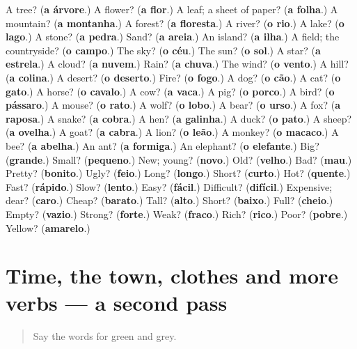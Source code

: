 \begin{tcolorbox}[breakable,colback=teal!4,colframe=teal!35!black,title={Before you move on}]
A tree? (\textbf{a árvore}.) A flower? (\textbf{a flor}.) A leaf; a sheet of paper? (\textbf{a folha}.) A mountain? (\textbf{a montanha}.) A forest? (\textbf{a floresta}.) A river? (\textbf{o rio}.) A lake? (\textbf{o lago}.) A stone? (\textbf{a pedra}.) Sand? (\textbf{a areia}.) An island? (\textbf{a ilha}.) A field; the countryside? (\textbf{o campo}.) The sky? (\textbf{o céu}.) The sun? (\textbf{o sol}.) A star? (\textbf{a estrela}.) A cloud? (\textbf{a nuvem}.) Rain? (\textbf{a chuva}.) The wind? (\textbf{o vento}.) A hill? (\textbf{a colina}.) A desert? (\textbf{o deserto}.) Fire? (\textbf{o fogo}.) A dog? (\textbf{o cão}.) A cat? (\textbf{o gato}.) A horse? (\textbf{o cavalo}.) A cow? (\textbf{a vaca}.) A pig? (\textbf{o porco}.) A bird? (\textbf{o pássaro}.) A mouse? (\textbf{o rato}.) A wolf? (\textbf{o lobo}.) A bear? (\textbf{o urso}.) A fox? (\textbf{a raposa}.) A snake? (\textbf{a cobra}.) A hen? (\textbf{a galinha}.) A duck? (\textbf{o pato}.) A sheep? (\textbf{a ovelha}.) A goat? (\textbf{a cabra}.) A lion? (\textbf{o leão}.) A monkey? (\textbf{o macaco}.) A bee? (\textbf{a abelha}.) An ant? (\textbf{a formiga}.) An elephant? (\textbf{o elefante}.) Big? (\textbf{grande}.) Small? (\textbf{pequeno}.) New; young? (\textbf{novo}.) Old? (\textbf{velho}.) Bad? (\textbf{mau}.) Pretty? (\textbf{bonito}.) Ugly? (\textbf{feio}.) Long? (\textbf{longo}.) Short? (\textbf{curto}.) Hot? (\textbf{quente}.) Fast? (\textbf{rápido}.) Slow? (\textbf{lento}.) Easy? (\textbf{fácil}.) Difficult? (\textbf{difícil}.) Expensive; dear? (\textbf{caro}.) Cheap? (\textbf{barato}.) Tall? (\textbf{alto}.) Short? (\textbf{baixo}.) Full? (\textbf{cheio}.) Empty? (\textbf{vazio}.) Strong? (\textbf{forte}.) Weak? (\textbf{fraco}.) Rich? (\textbf{rico}.) Poor? (\textbf{pobre}.) Yellow? (\textbf{amarelo}.)
\end{tcolorbox}
\section[(dialogue)]{Time, the town, clothes and more verbs — a second pass}

\label{lesson:PT-R81-second-pass-time-the-town-clothes-and-more-verbs}



\begin{quote}
Say the words for green and grey.
\end{quote}

